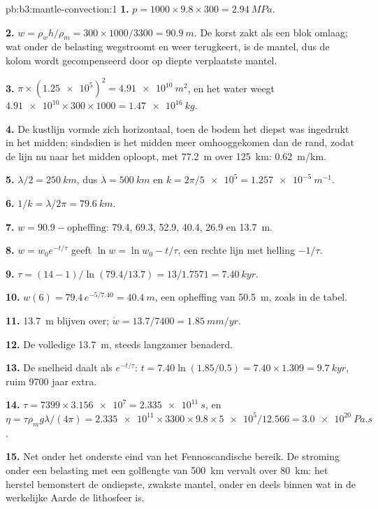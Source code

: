 \begin{solution}{pb:b3:mantle-convection:1}
\textbf{1.} $p = 1000\times9.8\times300 = \qty{2.94}{MPa}$.

\textbf{2.} $w = \rho_wh/\rho_m = 300\times1000/3300 = \qty{90.9}{m}$. De korst
zakt als een blok omlaag; wat onder de belasting wegstroomt en weer terugkeert, is de
mantel, dus de kolom wordt gecompenseerd door op diepte verplaatste mantel.

\textbf{3.} $\pi\times(\num{1.25e5})^2 = \qty{4.91e10}{m^2}$, en het water
weegt $\num{4.91e10}\times300\times1000 = \qty{1.47e16}{kg}$.

\textbf{4.} De kustlijn vormde zich horizontaal, toen de bodem het diepst was ingedrukt in
het midden; sindsdien is het midden meer omhooggekomen dan de rand, zodat de lijn nu
naar het midden oploopt, met \qty{77.2}{m} over \qty{125}{km}:
\qty{0.62}{m/km}.

\textbf{5.} $\lambda/2 = \qty{250}{km}$, dus $\lambda = \qty{500}{km}$ en $k =
2\pi/\num{5e5} = \qty{1.257e-5}{m^{-1}}$.

\textbf{6.} $1/k = \lambda/2\pi = \qty{79.6}{km}$.

\textbf{7.} $w = 90.9 - \text{opheffing}$: 79.4, 69.3, 52.9, 40.4, 26.9 en
\qty{13.7}{m}.

\textbf{8.} $w = w_0e^{-t/\tau}$ geeft $\ln w = \ln w_0 - t/\tau$, een rechte lijn
met helling $-1/\tau$.

\textbf{9.} $\tau = (14 - 1)/\ln(79.4/13.7) = 13/1.7571 = \qty{7.40}{kyr}$.

\textbf{10.} $w(6) = 79.4\,e^{-5/7.40} = \qty{40.4}{m}$, een opheffing van
\qty{50.5}{m}, zoals in de tabel.

\textbf{11.} \qty{13.7}{m} blijven over; $\dot w = 13.7/7400 = \qty{1.85}{mm/yr}$.

\textbf{12.} De volledige \qty{13.7}{m}, steeds langzamer benaderd.

\textbf{13.} De snelheid daalt als $e^{-t/\tau}$: $t = 7.40\ln(1.85/0.5) =
7.40\times1.309 = \qty{9.7}{kyr}$, ruim 9700 jaar extra.

\textbf{14.} $\tau = 7399\times\num{3.156e7} = \qty{2.335e11}{s}$, en $\eta =
\tau\rho_mg\lambda/(4\pi) = \num{2.335e11}\times3300\times9.8\times\num{5e5}/
12.566 = \qty{3.0e20}{Pa.s}$.

\textbf{15.} Net onder het onderste eind van het Fennoscandische bereik. De stroming
onder een belasting met een golflengte van \qty{500}{km} vervalt over \qty{80}{km}:
het herstel bemonstert de ondiepste, zwakste mantel, onder en deels binnen wat
in de werkelijke Aarde de lithosfeer is.


\end{solution}
